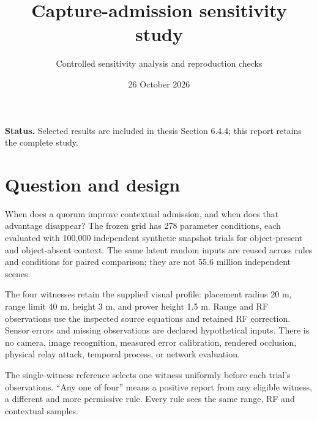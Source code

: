 \documentclass[11pt,a4paper]{article}
\title{Capture-admission sensitivity study}
\author{Controlled sensitivity analysis and reproduction checks}
\date{26 October 2026}
\begin{document}
\maketitle
\textbf{Status.} Selected results are included in thesis Section 6.4.4; this report retains the complete study.

\section*{Question and design}
When does a quorum improve contextual admission, and when does that advantage disappear?
The frozen grid has 278 parameter conditions, each evaluated with 100,000 independent synthetic
snapshot trials for object-present and object-absent context. The same latent random inputs are
reused across rules and conditions for paired comparison; they are not 55.6 million independent scenes.

The four witnesses retain the supplied visual profile: placement radius 20 m, range limit 40 m,
height 3 m, and prover height 1.5 m. Range and RF observations use the inspected source equations
and retained RF correction. Sensor errors and missing observations are declared hypothetical
inputs. There is no camera, image recognition, measured error calibration, rendered occlusion,
physical relay attack, temporal process, or network evaluation.

The single-witness reference selects one witness uniformly before each trial's observations.
``Any one of four'' means a positive report from any eligible witness, a different and more
permissive rule. Every rule sees the same range, RF and contextual samples.
\end{document}
